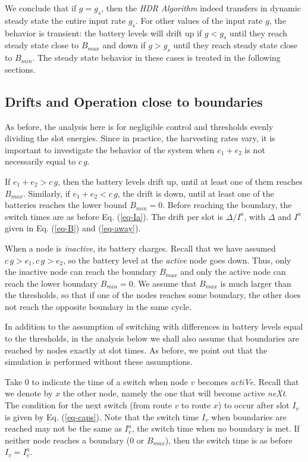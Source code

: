 \documentclass[12 pt]{article}
\newcommand{\debug}[1]{\mbox{\tt #1}}
\renewcommand{\debug}[1]{}              \newcommand{\cmd}[1]{}
\newcommand{\2}{\>\>}
\newcommand{\3}{\>\>\>}
\newcommand{\4}{\>\>\>\>}
\newcommand{\5}{\>\>\>\>\>}
\newcommand{\6}{\>\>\>\>\>\>}
\newcommand{\7}{\6\>}
\newcommand{\8}{\6\2}
\newcommand{\dlabel}[1]{\debug{\fbox{\tiny #1}}\cmd{dlabel}\label{#1}}
\newcommand{\dref}[1]{\ref{#1}\debug{[#1]}\cmd{dref}}
\begin{document}
We conclude that if $g = g_s$, then the \emph{HDR Algorithm} indeed transfers in dynamic steady state the entire input rate $g_s$.   For other values of the input rate $g$, the behavior is transient:  the battery levels will drift up if $g < g_s$ until they reach steady state close to $B_{max}$ and down if $g > g_s$ until they reach steady state close to $B_{min}$.  The steady state behavior in these cases is treated in the following sections.


\subsection{Drifts and Operation close to boundaries}\dlabel{close}

As before, the analysis here is for negligible control and thresholds evenly dividing the slot energies.  Since in practice, the harvesting rates vary, it is important to investigate the behavior of the system  when $e_1 + e_2$ is not necessarily equal to $c\,g$.

If $ e_1 + e_2 > c\,g$, then the battery levels drift up, until at least one of them reaches $B_{max}$.  Similarly, if $ e_1 + e_2  < c\,g$, the drift is down, until at least one of the batteries reaches the lower bound $B_{min} = 0$.  Before reaching the boundary, the switch times are as before Eq. (\dref{eq-Ia}).  The drift per slot is $\Delta/I^a$, with $\Delta$ and $I^a$ given in Eq. (\dref{eq-B}) and (\dref{eq-away}).

When a node is \emph{inactive}, its battery charges. Recall that we have assumed $c \,g > e_1, c\,g > e_2$, so the battery level at the \emph{active} node goes down.  Thus, only the inactive node can reach the boundary $B_{max}$ and only the active node can reach the lower boundary $B_{min} = 0$.  We assume that $B_{max}$ is much larger than the thresholds, so that if one of the nodes reaches some boundary, the other does not reach the opposite boundary in the same cycle.

In addition to the assumption of switching with differences in battery levels equal to the thresholds, in the analysis below we shall also assume that boundaries are reached by nodes exactly at slot times.  As before, we point out that the simulation is performed without these assumptions.

Take $0$ to indicate the time of a switch when node $v$ becomes \emph{actiVe}.  Recall that we denote by  $x$ the other node, namely the one that will become active \emph{neXt}.  The condition for the next switch (from route $v$ to route $x$) to occur after slot $I_v$ is given by Eq. (\dref{eq-caps}).  Note that the switch time $I_v$ when boundaries are reached may not be the same as $I_v^a$, the switch time when no boundary is met.
If neither node reaches a boundary (0 or $B_{max}$), then the switch time is as before $I_v=I_v^a$.
\end{document}
